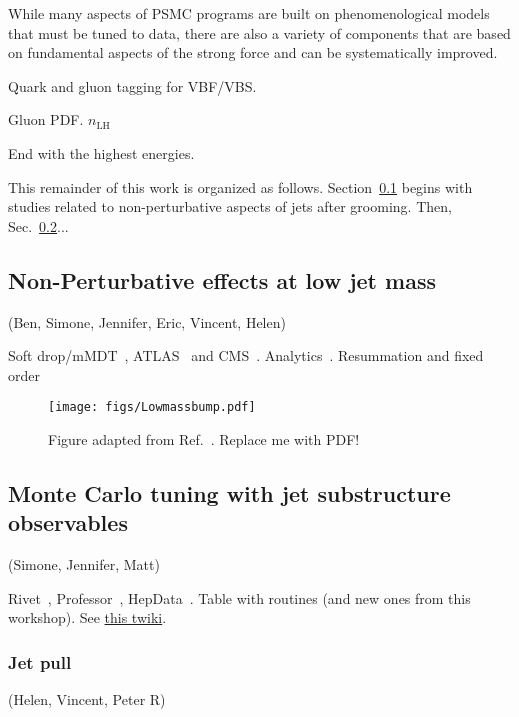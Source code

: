 \documentclass[11pt]{cernrep}
\begin{document}
While many aspects of PSMC programs are built on phenomenological models that must be tuned to data, there are also a variety of components that are based on fundamental aspects of the strong force and can be systematically improved. 

Quark and gluon tagging for VBF/VBS.

Gluon PDF.  $n_\text{LH}$~\cite{Frye:2017yrw,Marzani:2019hun}

End with the highest energies.

This remainder of this work is organized as follows.  Section~\ref{sec:jets:np} begins with studies related to non-perturbative aspects of jets after grooming.  Then, Sec.~\ref{sec:jets:mc}...

\subsection{Non-Perturbative effects at low jet mass}
\label{sec:jets:np}
(Ben, Simone, Jennifer, Eric, Vincent, Helen)

Soft drop/mMDT~\cite{Larkoski:2014wba,Dasgupta:2013ihk}, ATLAS~\cite{Aaboud:2017qwh,Aad:2019vyi} and CMS~\cite{Sirunyan:2018xdh}.  Analytics~\cite{Hoang:2019ceu}.  Resummation and fixed order~\cite{Frye:2016aiz,Frye:2016okc,Marzani:2017mva,Marzani:2017kqd,Kang:2018vgn,Kang:2018jwa,Baron:2018nfz,Kardos:2018kth}

\begin{figure}[h!]
\centering
\texttt{[image: figs/Lowmassbump.pdf]}
\caption{Figure adapted from Ref.~\cite{Frye:2016aiz}.  Replace me with PDF!}
\label{fig:jets:np:illustration}
\end{figure}

\subsection{Monte Carlo tuning with jet substructure observables}
\label{sec:jets:mc}
(Simone, Jennifer, Matt)



Rivet~\cite{Buckley:2010ar}, Professor~\cite{Buckley:2009bj}, HepData~\cite{Buckley:2010jn,Maguire:2017ypu}.  Table with routines (and new ones from this workshop).  See \href{https://twiki.cern.ch/twiki/bin/view/LHCPhysics/LHCJetSubstructureMeasurements}{this twiki}.

\subsubsection{Jet pull}
\label{sec:jets:pull}
(Helen, Vincent, Peter R)
\end{document}
